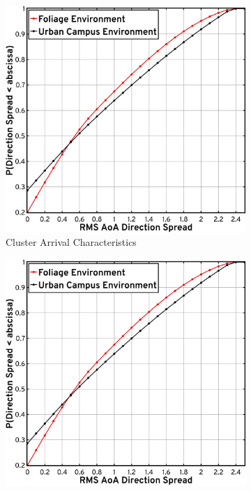 \documentclass[10pt, twocolumn]{IEEEtran}
\begin{document}
{\begin{figure} [t]
    \centering
    \begin{subfigure}{0.495\linewidth}
        \centering
        \includegraphics[width=1.0\linewidth]{figs/rms_direction_spread.pdf}
        \caption{Cluster Arrival Characteristics}
        \label{F12a}
    \end{subfigure}
    \begin{subfigure}{0.495\linewidth}
        \centering
        \includegraphics[width=1.0\linewidth]{figs/rms_direction_spread.pdf}

\end{subfigure}
\end{figure}}
\end{document}
